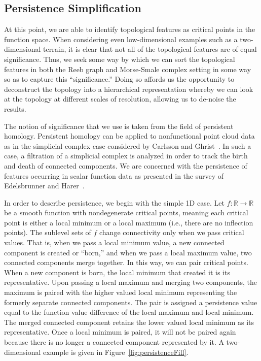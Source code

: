 \subsection{Persistence Simplification}
At this point, we are able to identify topological features as critical points in the function space.
%
When considering even low-dimensional examples such as a two-dimensional terrain, it is clear that not all of the topological features are of equal significance.
%
Thus, we seek some way by which we can sort the topological features in both the Reeb graph and  Morse-Smale complex setting in some way so as to capture this ``significance.''
%
Doing so affords us the opportunity to deconstruct the topology into a hierarchical representation whereby we can look at the topology at different scales of resolution, allowing us to de-noise the results.

The notion of significance that we use is taken from the field of persistent homology.
%
Persistent homology can be applied to nonfunctional point cloud data as in the simplicial complex case considered by Carlsson and Ghrist~\cite{Carlsson2009,Ghrist2009}.
%
In such a case, a filtration of a simplicial complex is analyzed in order to track the birth and death of connected components.
%
We are concerned with the persistence of features occurring in scalar function data as presented in the survey of Edelsbrunner and Harer~\cite{EdelsbrunnerHarer2008}.

In order to describe persistence, we begin with the simple 1D case.
%
Let $f: \mathbb{R} \rightarrow \mathbb{R}$ be a smooth function with nondegenerate critical points, meaning each critical point is either a local minimum or a local maximum (i.e., there are no inflection points).
%
The sublevel sets of $f$ change connectivity only when we pass critical values.
%
That is, when we pass a local minimum value, a new connected component is created or ``born,'' and when we pass a local maximum value, two connected components merge together.
%
In this way, we can pair critical points.
%
When a new component is born, the local minimum that created it is its representative.
%
Upon passing a local maximum and merging two components, the maximum is paired with the higher valued local minimum representing the formerly separate connected components.
%
The pair is assigned a persistence value equal to the function value difference of the local maximum and local minimum.
%
The merged connected component retains the lower valued local minimum as its representative.
%
Once a local minimum is paired, it will not be paired again because there is no longer a connected component represented by it.
%
A two-dimensional example is given in Figure~\ref{fig:persistenceFill}.

